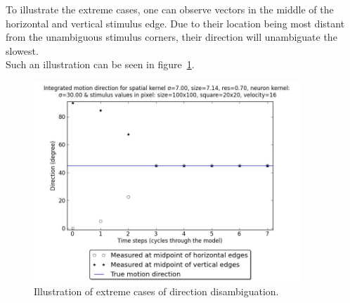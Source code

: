 \documentclass[a4paper]{article}
\begin{document}
To illustrate the extreme cases, one can observe vectors in the middle of the horizontal and vertical stimulus edge. Due to their location being most distant from the unambiguous stimulus corners, their direction will unambiguate the slowest.\\
Such an illustration can be seen in figure~\ref{fig:integratedMotion}.

\vspace{0.5cm}
\begin{figure}[ht]
\centering
\includegraphics[width=10cm]{pics/integratedMotion}
\caption{Illustration of extreme cases of direction disambiguation.}
\label{fig:integratedMotion}
\end{figure}
\vspace{0.5cm}
\end{document}
